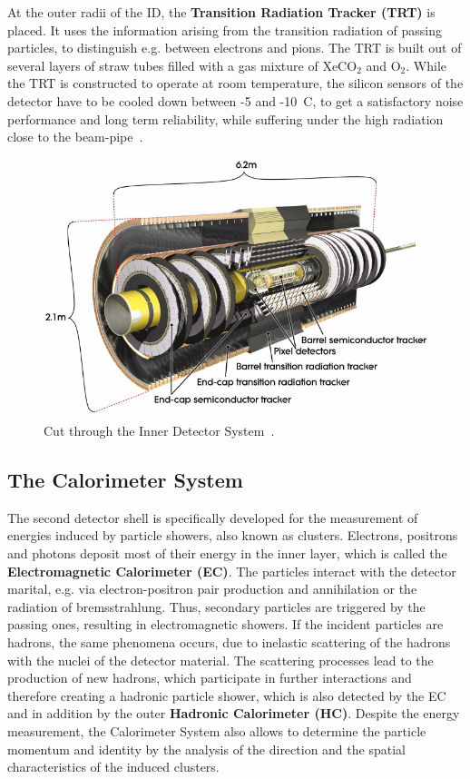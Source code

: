  At the outer radii of the ID, the \textbf{Transition Radiation Tracker (TRT)} is placed.
It uses the information arising from the transition radiation of passing particles, to distinguish e.g. between electrons and pions. The TRT is built out of several layers of straw tubes filled with a gas mixture of XeCO$_2$ and O$_2$. While the TRT is constructed to operate at room temperature, the silicon sensors of the detector have to be cooled down between -5 and -10~\textdegree C, to get a satisfactory noise performance and long term reliability, while suffering under the high radiation close to the beam-pipe~\cite{Aad:2008zzm}.     
\begin{figure}[t]
	\centering
	\includegraphics[width=0.7\linewidth]{Pics/cp3/34}
	\caption{Cut through the Inner Detector System~\cite{Aad:2008zzm}.} 
	\label{fig:34}
\end{figure}

\subsection{The Calorimeter System}\label{CD}




The second detector shell is specifically developed for the measurement of energies induced by particle showers, also known as clusters. 
Electrons, positrons and photons deposit most of their energy in the inner layer, which is called the \textbf{Electromagnetic Calorimeter (EC)}.  The particles interact with the  detector marital, e.g. via electron-positron pair production and annihilation or the radiation of bremsstrahlung. Thus, secondary particles are triggered by the passing ones, resulting in electromagnetic showers. If the incident particles are hadrons, the same phenomena occurs, due to inelastic scattering  of the hadrons with the nuclei of the detector material. The scattering processes lead to the production of new hadrons, which participate in further interactions and therefore creating a hadronic particle shower, which is also detected by the EC and in addition by the outer \textbf{Hadronic Calorimeter (HC)}. Despite the energy measurement, the Calorimeter System also allows to determine the particle momentum and identity by the analysis of the direction and the spatial characteristics of the induced clusters.

